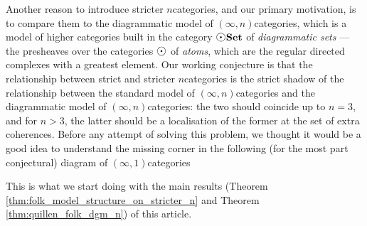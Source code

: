 Another reason to introduce stricter \( n \)\nbd categories, and our primary motivation, is to compare them to the diagrammatic model of \( (\infty, n) \)\nbd categories, which is a model of higher categories \cite{chanavat2024htpy,chanavat2024model} built in the category \( \dgmSet \) of \emph{diagrammatic sets} --- the presheaves over the categories \( \atom \) of \emph{atoms}, which are the regular directed complexes with a greatest element.  
Our working conjecture is that the relationship between strict and stricter \( n \)\nbd categories is the strict shadow of the relationship between the standard model of \( (\infty, n) \)\nbd categories \cite{barwick2020unicity} and the diagrammatic model of \( (\infty, n) \)\nbd categories: the two should coincide up to \( n = 3 \), and for \( n > 3 \), the latter should be a localisation of the former at the set of extra coherences.
Before any attempt of solving this problem, we thought it would be a good idea to understand the missing corner in the following (for the most part conjectural) diagram of \( (\infty, 1) \)\nbd categories
\begin{center}
\end{center}
This is what we start doing with the main results (Theorem \ref{thm:folk_model_structure_on_stricter_n} and Theorem \ref{thm:quillen_folk_dgm_n}) of this article.
